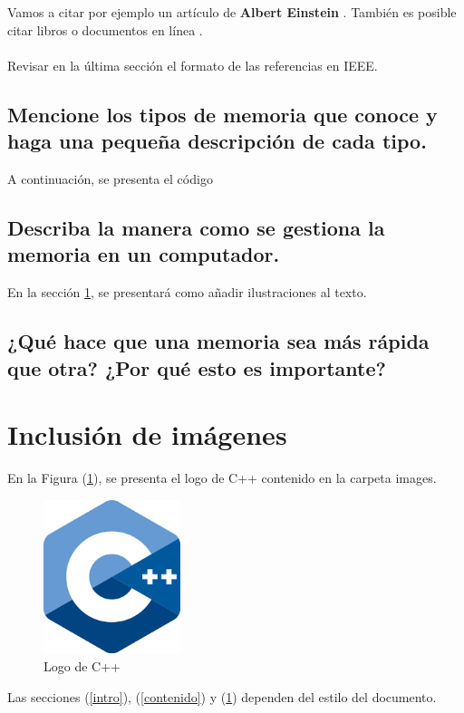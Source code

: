 \documentclass{article}
\begin{document}
Vamos a citar por ejemplo un artículo de \textbf{Albert Einstein} \cite{einstein}.
También es posible citar libros \cite{dirac} o documentos en línea \cite{knuthwebsite}.\\\\
Revisar en la última sección el formato de las referencias en IEEE.

\subsection{Mencione los tipos de memoria que conoce y haga una pequeña descripción de cada tipo.}
%
A continuación, se presenta el código 
\subsection{Describa la manera como se gestiona la memoria en un computador.}
En la sección \ref{imagenes}, se presentará como añadir ilustraciones al texto.
\subsection{¿Qué hace que una memoria sea más rápida que otra? ¿Por qué esto es importante?}

\section{Inclusión de imágenes} \label{imagenes}

En la Figura (\ref{fig:cpplogo}), se presenta el logo de C++ contenido en la carpeta images.

\begin{figure}[h]
\includegraphics[width=4cm]{cpplogo.png}
\centering
\caption{Logo de C++}
\label{fig:cpplogo}
\end{figure}

Las secciones (\ref{intro}), (\ref{contenido}) y (\ref{imagenes}) dependen del estilo del documento.



\end{document}
